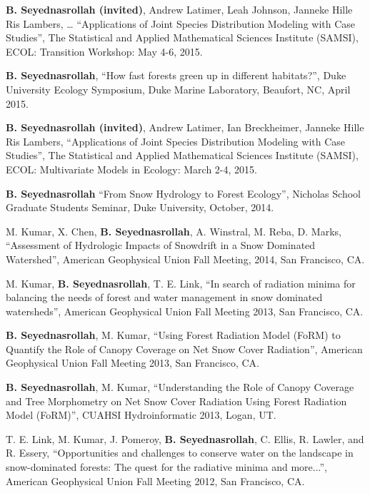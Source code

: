 \documentclass[10pt]{article}
\newenvironment{changemargin}[2]{%
  \begin{list}{}{%
    \setlength{\topsep}{0pt}%
    \setlength{\leftmargin}{#1}%
    \setlength{\rightmargin}{#2}%
    \setlength{\listparindent}{\parindent}%
    \setlength{\itemindent}{\parindent}%
    \setlength{\parsep}{\parskip}%
  }%
  \item[]}{\end{list}
}
\newenvironment{body} {
	\vspace*{-2pt}
	\begin{changemargin}{-0.5in}{-0.5in}
  }
	{\end{changemargin}
}
\begin{document}
\begin{body}
   \textbf{B. Seyednasrollah (invited)}, Andrew Latimer, Leah Johnson, Janneke Hille Ris Lambers, … ``Applications of Joint Species Distribution Modeling with Case Studies'', The Statistical and Applied Mathematical Sciences Institute (SAMSI), ECOL: Transition Workshop: May 4-6, 2015.\\
  \medskip

   \textbf{B. Seyednasrollah}, ``How fast forests green up in different habitats?'', Duke University Ecology Symposium, Duke Marine Laboratory, Beaufort, NC, April 2015.\\
\medskip

   \textbf{B. Seyednasrollah (invited)}, Andrew Latimer, Ian Breckheimer, Janneke Hille Ris Lambers, ``Applications of Joint Species Distribution Modeling with Case Studies'', The Statistical and Applied Mathematical Sciences Institute (SAMSI), ECOL: Multivariate Models in Ecology: March 2-4, 2015.\\
  \medskip

 \textbf{B. Seyednasrollah} ``From Snow Hydrology to Forest Ecology'', Nicholas School Graduate Students Seminar, Duke University, October, 2014.\\
\medskip

   M. Kumar, X. Chen, \textbf{B. Seyednasrollah}, A. Winstral, M. Reba, D. Marks, ``Assessment of Hydrologic Impacts of Snowdrift in a Snow Dominated Watershed'', American Geophysical Union Fall Meeting, 2014, San Francisco, CA.\\
\medskip

   M. Kumar, \textbf{B. Seyednasrollah}, T. E. Link, ``In search of radiation minima for balancing the needs of forest and water management in snow dominated watersheds'', American Geophysical Union Fall Meeting 2013, San Francisco, CA.\\
\medskip

   \textbf{B. Seyednasrollah}, M. Kumar, ``Using Forest Radiation Model (FoRM) to Quantify the Role of Canopy Coverage on Net Snow Cover Radiation'', American Geophysical Union Fall Meeting 2013, San Francisco, CA.\\
\medskip

   \textbf{B. Seyednasrollah}, M. Kumar, ``Understanding the Role of Canopy Coverage and Tree Morphometry on Net Snow Cover Radiation Using Forest Radiation Model (FoRM)'', CUAHSI Hydroinformatic 2013, Logan, UT.\\
\medskip

   T. E. Link, M. Kumar, J. Pomeroy, \textbf{B. Seyednasrollah}, C. Ellis, R. Lawler, and R. Essery, ``Opportunities and challenges to conserve water on the landscape in snow-dominated forests: The quest for the radiative minima and more...'', American Geophysical Union Fall Meeting 2012, San Francisco, CA.\\
\medskip


\end{body}
\end{document}
